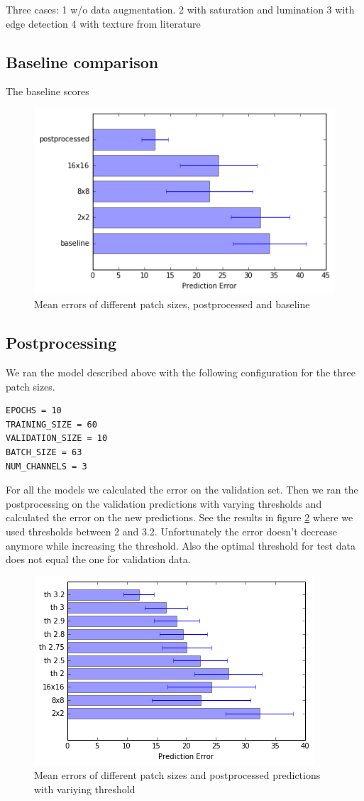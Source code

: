 \documentclass[10pt,conference,compsocconf]{IEEEtran}
\begin{document}
Three cases: 
1 w/o data augmentation.
2 with saturation and lumination
3 with edge detection
4 with texture from literature

\subsection{Baseline comparison}
The baseline scores \begin{figure}
	\centering
	\includegraphics[width=.8\columnwidth]{pictures/baseline}
	\caption{Mean errors of different patch sizes, postprocessed and baseline}
	\label{fig:baseline}
\end{figure}

\subsection{Postprocessing}
We ran the model described above with the following configuration for the three patch sizes. 
\begin{lstlisting}
EPOCHS = 10
TRAINING_SIZE = 60
VALIDATION_SIZE = 10
BATCH_SIZE = 63
NUM_CHANNELS = 3
\end{lstlisting}
For all the models we calculated the error on the validation set. Then we ran the postprocessing on the validation predictions with varying thresholds and calculated the error on the new predictions. See the results in figure \ref{fig:postprocessing} where we used thresholds between 2 and 3.2. Unfortunately the error doesn't decrease anymore while increasing the threshold. Also the optimal threshold for test data does not equal the one for validation data.

\begin{figure}
	\centering
	\includegraphics[width=.8\columnwidth]{pictures/postprocessing}
	\caption{Mean errors of different patch sizes and postprocessed predictions with variying threshold}
	\label{fig:postprocessing}
\end{figure}
\end{document}
